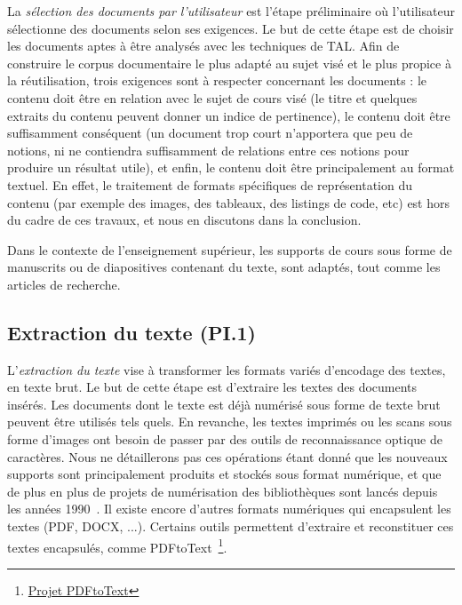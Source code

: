 La \textit{sélection des documents par l'utilisateur} est l'étape préliminaire où l'utilisateur sélectionne des documents selon ses exigences.
Le but de cette étape est de choisir les documents aptes à être analysés avec les techniques de TAL.
Afin de construire le corpus documentaire le plus adapté au sujet visé et le plus propice à la réutilisation, trois exigences sont à respecter concernant les documents : le contenu doit être en relation avec le sujet de cours visé (le titre et quelques extraits du contenu peuvent donner un indice de pertinence), le contenu doit être suffisamment conséquent (un document trop court n'apportera que peu de notions, ni ne contiendra suffisamment de relations entre ces notions pour produire un résultat utile), et enfin, le contenu doit être principalement au format textuel.
En effet, le traitement de formats spécifiques de représentation du contenu (par exemple des images, des tableaux, des listings de code, etc) est hors du cadre de ces travaux, et nous en discutons dans la conclusion.

\bigskip

Dans le contexte de l'enseignement supérieur, les supports de cours sous forme de manuscrits ou de diapositives contenant du texte, sont adaptés, tout comme les articles de recherche.


\subsection{Extraction du texte (PI.1)}
\label{subsection:CREA:PI.2-extraction}

L'\textit{extraction du texte} vise à transformer les formats variés d'encodage des textes, en texte brut.
Le but de cette étape est d'extraire les textes des documents insérés.
Les documents dont le texte est déjà numérisé sous forme de texte brut peuvent être utilisés tels quels.
En revanche, les textes imprimés ou les scans sous forme d'images ont besoin de passer par des outils de reconnaissance optique de caractères.
Nous ne détaillerons pas ces opérations étant donné que les nouveaux supports sont principalement produits et stockés sous format numérique, et que de plus en plus de projets de numérisation des bibliothèques sont lancés depuis les années 1990~\cite{brosset:dumas-01376071}.
Il existe encore d'autres formats numériques qui encapsulent les textes (PDF, DOCX, ...).
Certains outils permettent d'extraire et reconstituer ces textes encapsulés, comme PDFtoText~\footnote{ \href{https://www.xpdfreader.com/pdftotext-man.html}{Projet PDFtoText} }.


